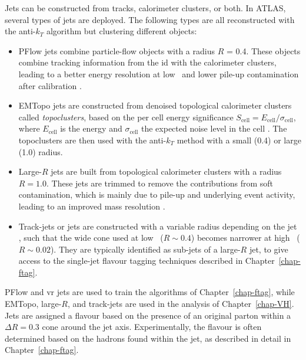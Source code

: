 Jets can be constructed from tracks, calorimeter clusters, or both. In ATLAS, several types of jets are deployed. The following types are all reconstructed with the anti-$k_T$ algorithm but clustering different objects:
\begin{itemize}[leftmargin=*]
\item PFlow jets combine particle-flow objects \cite{atlasPFLOWjet} with a radius $R$ = 0.4. These objects combine tracking information from the \gls{id} with the calorimeter clusters, leading to a better energy resolution at low \pt\ and lower pile-up contamination after calibration \cite{PhysRevD.96.072002}.
\item EMTopo jets are constructed from denoised topological calorimeter clusters called \textit{topoclusters}, based on the per cell energy significance $S_{\text{cell}} = E_{\text{cell}} / \sigma_{\text{cell}}$, where $E_{\text{cell}}$ is the energy and $\sigma_{\text{cell}}$ the expected noise level in the cell \cite{atlasEMTOpo}. The topoclusters are then used with the anti-$k_T$ method with a small (0.4) or large (1.0) radius.
\item Large-$R$ jets are built from topological calorimeter clusters with a radius $R = 1.0$. These jets are trimmed to remove the contributions from soft contamination, which is mainly due to pile-up and underlying event activity, leading to an improved mass resolution \cite{ATLAS:largeRjet}.
\item Track-jets or  jets are constructed with a variable radius depending on the jet \pt, such that the wide cone used at low \pt\ ($R \sim 0.4$) becomes narrower at high \pt\ ($R \sim 0.02$). They are typically identified as sub-jets of a large-$R$ jet, to give access to the single-jet flavour tagging techniques described in Chapter~\ref{chap-ftag}.
\end{itemize}
PFlow and \gls{vr} jets are used to train the algorithms of Chapter~\ref{chap-ftag}, while EMTopo, large-$R$, and track-jets are used in the analysis of Chapter~\ref{chap-VH}. Jets are assigned a flavour based on the presence of an original parton within a $\Delta R = 0.3$ cone around the jet axis. Experimentally, the flavour is often determined based on the hadrons found within the jet, as described in detail in Chapter~\ref{chap-ftag}. \\

